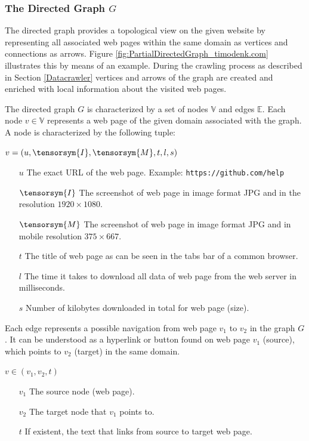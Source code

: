 \subsubsection{The Directed Graph $G$}
\label{TheDirectedGraph}
The directed graph provides a topological view on the given website by representing all associated web pages within the same domain as vertices and connections as arrows. Figure \ref{fig:PartialDirectedGraph_timodenk.com} illustrates this by means of an example. During the crawling process as described in Section \ref{Datacrawler} vertices and arrows of the graph are created and enriched with local information about the visited web pages.

The directed graph $G$ is characterized by a set of nodes $\mathbb{V}$ and edges $\mathbb{E}$. Each node $v \in \mathbb{V}$ represents a web page of the given domain associated with the graph. A node is characterized by the following tuple:

\begin{center}
$v = (u, \tensorsym{I}, \tensorsym{M},t, l, s)$
\begin{itemize}
	\item[$u$] The exact URL of the web page. Example: \texttt{https://github.com/help}
	\item[$\tensorsym{I}$] The screenshot of web page in image format JPG and in the resolution $1920\times1080$.
	\item[$\tensorsym{M}$] The screenshot of web page in image format JPG and in mobile resolution $375\times 667$.
	\item[$t$] The title of web page as can be seen in the tabs bar of a common browser.
	\item[$l$] The time it takes to download all data of web page from the web server in milliseconds.
	\item[$s$] Number of kilobytes downloaded in total for web page (size).
\end{itemize}
\end{center}

Each edge represents a possible navigation from web page $v_1$ to $v_2$ in the graph $G$. It can be understood as a hyperlink or button found on web page $v_1$ (source), which points to $v_2$ (target) in the same domain. 

\begin{center}
	$v \in (v_1, v_2, t)$
	\begin{itemize}
		\item[$v_1$] The source node (web page).
		\item[$v_2$] The target node that $v_1$ points to.
		\item[$t$] If existent, the text that links from source to target web page.
	\end{itemize}
\end{center}

